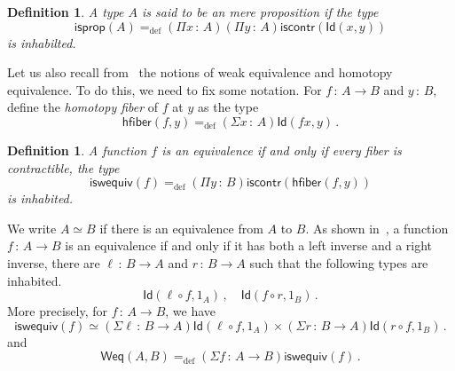\documentclass[10pt,a4paper,oneside,reqno]{amsart}
\theoremstyle{mythm}
\theoremstyle{mydef}
\newtheorem{definition}[theorem]{Definition}
\theoremstyle{myrmk}
\newcommand{\ie}{\text{i.e.\ }}
\newcommand{\defeq}{=_{\mathrm{def}}}
\newcommand{\co}{\,{:}\,}
\newcommand{\hfiber}{\mathsf{hfiber}}
\newcommand{\iscontr}{\mathsf{iscontr}}
\newcommand{\isprop}{\mathsf{isprop}}
\newcommand{\iswequiv}{\mathsf{iswequiv}}
\newcommand{\Id}{\mathsf{Id}}
\begin{document}
\begin{definition} A type $A$ is said to be an \emph{mere proposition} if the type
\[
\isprop(A) \defeq (\Pi x \co A)(\Pi  y \co A) \iscontr( \Id(x,y)) 
\]
is inhabilted.
\end{definition}

Let us also recall from~\cite{VoevodskyV:unifc} the notions of weak equivalence and homotopy equivalence. To do this, we need to fix some notation. For $f \co A \rightarrow B$ and $y \co B$, define the \emph{homotopy fiber} of $f$ at $y$ as the type
\[
 \hfiber(f,y) \defeq (\Sigma x \co A) \Id(f x, y) \, .
\]


\begin{definition} A function $f$ is  an \emph{equivalence} if and only if every fiber is contractible, \ie the type
\[
 \iswequiv(f) \defeq (\Pi y \co B)  \iscontr(\hfiber(f,y)) 
\]
is inhabited. 
\end{definition}

 We write $A\simeq B$ if there is an equivalence from $A$ to $B$.   As shown in~\cite{HoTT}, a function $f \co A \rightarrow B$ is an equivalence if and only if  it has both a left inverse and a right inverse, \ie there are 
$\ell \co B \to A$ and $r \co B \to A$ such that the following types are inhabited. 
\[
 \Id(\ell \circ f, 1_A)\, ,  \quad  \Id(f \circ r, 1_B) \, .
 \] 
More precisely, for $f \co A \rightarrow B$, we have
 \[ 
 \textstyle
 \iswequiv(f) \simeq (\Sigma \ell \co B \to A) \Id( \ell \circ f, 1_A) \times (\Sigma r \co B \to A) \Id( r \circ f , 1_B) \, .
 \]
 and 
 \begin{equation}
 \label{equ:weq}
 \mathsf{Weq}(A,B) \defeq (\Sigma f \co A \to B) \iswequiv(f) \, .
 \end{equation}
\end{document}
